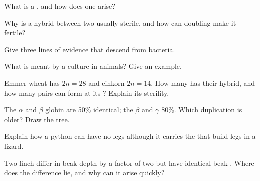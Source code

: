 \begin{exercise}[$\star$]\label{exo:g12:diversification-of-life:2}
What is a , and how does one arise?
\end{exercise}

\begin{exercise}[$\star$]\label{exo:g12:diversification-of-life:3}
Why is a hybrid between two  usually sterile, and how can
 doubling make it fertile?
\end{exercise}

\begin{exercise}[$\star$]\label{exo:g12:diversification-of-life:4}
Give three lines of evidence that  descend from bacteria.
\end{exercise}

\begin{exercise}[$\star$]\label{exo:g12:diversification-of-life:5}
What is meant by a culture in animals? Give an example.
\end{exercise}

\begin{exercise}[$\star\star$]\label{exo:g12:diversification-of-life:6}
Emmer wheat has $2n = 28$ and einkorn $2n = 14$. How many 
has their hybrid, and how many pairs can form at its ? Explain
its sterility.
\end{exercise}

\begin{exercise}[$\star\star$]\label{exo:g12:diversification-of-life:7}
The $\alpha$ and $\beta$ globin  are 50\% identical; the $\beta$
and $\gamma$  80\%. Which duplication is older? Draw the tree.
\end{exercise}

\begin{exercise}[$\star\star$]\label{exo:g12:diversification-of-life:8}
Explain how a python can have no legs although it carries the 
that build legs in a lizard.
\end{exercise}

\begin{exercise}[$\star\star$]\label{exo:g12:diversification-of-life:9}
Two finch  differ in beak depth by a factor of two but have
identical beak . Where does the difference lie, and why can it
arise quickly?
\end{exercise}

